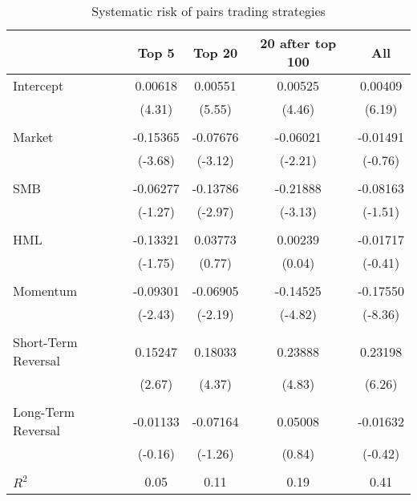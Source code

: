 \begin{table}[H]
\centering
\caption{Systematic risk of pairs trading strategies}
\label{tab:systematic_risk}
\footnotesize 
\begin{tabular}{lcccc}
\toprule
 & Top 5 & Top 20 & 20 after top 100 & All \\
\midrule
Intercept & 0.00618 & 0.00551 & 0.00525 & 0.00409 \\
 & \tiny(4.31) & \tiny(5.55) & \tiny(4.46) & \tiny(6.19) \\
\\[-0.5em]
Market & -0.15365 & -0.07676 & -0.06021 & -0.01491 \\
 & \tiny(-3.68) & \tiny(-3.12) & \tiny(-2.21) & \tiny(-0.76) \\
\\[-0.5em]
SMB & -0.06277 & -0.13786 & -0.21888 & -0.08163 \\
 & \tiny(-1.27) & \tiny(-2.97) & \tiny(-3.13) & \tiny(-1.51) \\
\\[-0.5em]
HML & -0.13321 & 0.03773 & 0.00239 & -0.01717 \\
 & \tiny(-1.75) & \tiny(0.77) & \tiny(0.04) & \tiny(-0.41) \\
\\[-0.5em]
Momentum & -0.09301 & -0.06905 & -0.14525 & -0.17550 \\
 & \tiny(-2.43) & \tiny(-2.19) & \tiny(-4.82) & \tiny(-8.36) \\
\\[-0.5em]
Short-Term Reversal & 0.15247 & 0.18033 & 0.23888 & 0.23198 \\
 & \tiny(2.67) & \tiny(4.37) & \tiny(4.83) & \tiny(6.26) \\
\\[-0.5em]
Long-Term Reversal & -0.01133 & -0.07164 & 0.05008 & -0.01632 \\
 & \tiny(-0.16) & \tiny(-1.26) & \tiny(0.84) & \tiny(-0.42) \\
\\[-0.5em]
$R^2$ & 0.05 & 0.11 & 0.19 & 0.41 \\
\bottomrule
\end{tabular}
\end{table}